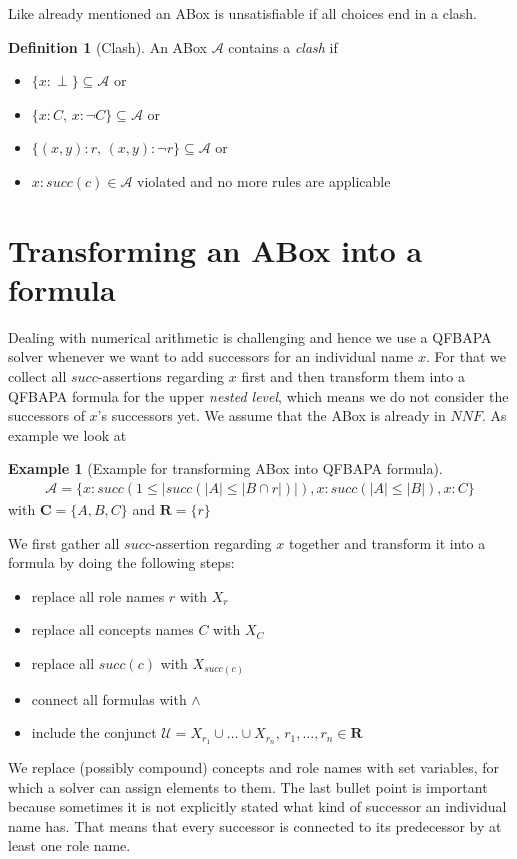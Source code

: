 \documentclass{book}
\theoremstyle{break}
\theoremstyle{definition}
\newtheorem{mydef}{Definition}
\newtheorem{ex}{Example}
\begin{document}
Like already mentioned an ABox is unsatisfiable if all choices end in a clash.
\begin{mydef}[Clash]
An ABox $\mathcal{A}$ contains a \textit{clash} if
\begin{itemize}
\item $\{x:\perp\}\subseteq \mathcal{A}$ or
\item $\{x:C,\,x:\neg C\}\subseteq \mathcal{A}$ or
\item $\{(x,y):r,\,(x,y):\neg r\}\subseteq \mathcal{A}$ or
\item $x:succ(c)\in \mathcal{A}$ violated and no more rules are applicable
\end{itemize}
\end{mydef}
\section{Transforming an ABox into a formula}
Dealing with numerical arithmetic is challenging and hence we use a QFBAPA solver whenever we want to add successors for an individual name $x$. For that we collect all $succ$-assertions regarding $x$ first and then transform them into a QFBAPA formula for the upper \textit{nested level}, which means we do not consider the successors of $x$'s successors yet. We assume that the ABox is already in $NNF$. As example we look at
\begin{ex}[Example for transforming ABox into QFBAPA formula]
\begin{align*}
\mathcal{A}=\{x:succ(1\leq|succ(|A|\leq|B\cap r|)|), x:succ(|A|\leq |B|), x:C\}
\end{align*}
with $\mathbf{C}=\{A,B,C\}$ and $\mathbf{R}=\{r\}$
\end{ex}
We first gather all $succ$-assertion regarding $x$ together and transform it into a formula by doing the following steps:
\begin{itemize}
\item replace all role names $r$ with $X_r$
\item replace all concepts names $C$ with $X_C$
\item replace all $succ(c)$ with $X_{succ(c)}$
\item connect all formulas with $\wedge$
\item include the conjunct $\mathcal{U}=X_{r_1}\cup\dots\cup X_{r_n}$, $r_1,\dots, r_n\in\mathbf{R}$
\end{itemize}
We replace (possibly compound) concepts and role names with set variables, for which a solver can assign elements to them. The last bullet point is important because sometimes it is not explicitly stated what kind of successor an individual name has. That means that every successor is connected to its predecessor by at least one role name.\\
\end{document}
